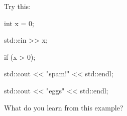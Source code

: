 Try this:\\

\begin{console}

int x = 0;

std::cin >> x;

if (x > 0);

   std::cout << "spam!" << std::endl;

std::cout << "eggs" << std::endl;

\end{console}

What do you learn from this example?

